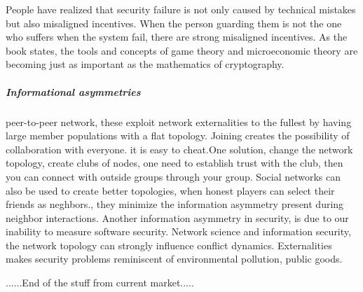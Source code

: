 People have realized that security failure is not only caused by technical mistakes but also misaligned incentives. When the person guarding them is not the one who suffers when the system fail, there are strong misaligned incentives. As the book \cite{anderson2010security} states, the tools and concepts of game theory and microeconomic theory are becoming just as important as the mathematics of cryptography.
\subparagraph{Informational asymmetries}
peer-to-peer network, these exploit network externalities to the fullest by having large member populations with a flat topology. Joining creates the possibility of collaboration with everyone. 
it is easy to cheat.One solution, change the network topology, create clubs of nodes, 
one need to establish trust with the club, then you can connect with outside groups through
 your group. Social networks can also be used to create better topologies, when honest players 
 can select their friends as neghbors., they minimize the information asymmetry present during
  neighbor interactions. 
Another information asymmetry in security, is due to our inability to measure software security. 
Network science and information security, the network topology can strongly influence conflict dynamics.
Externalities makes security problems reminiscent of environmental pollution, public goods. 

......End of the stuff from current market.....





